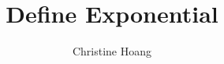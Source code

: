 \documentclass{article}
\title{Define Exponential}
\author{Christine Hoang}
\begin{document}
\maketitle

\section{}
\end{document}
